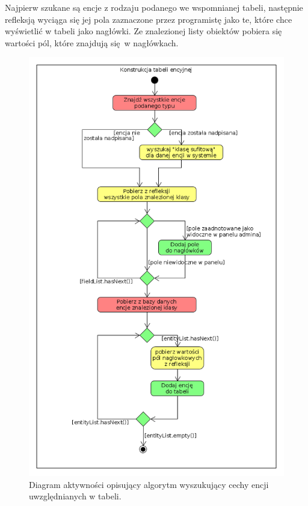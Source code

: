 Najpierw szukane są encje z rodzaju podanego we wspomnianej tabeli, następnie refleksją wyciąga się jej pola zaznaczone przez programistę jako te, które chce wyświetlić w tabeli jako nagłówki. Ze znalezionej listy obiektów pobiera się wartości pól, które znajdują się w nagłówkach.
\begin{figure}
	\begin{center}
		\includegraphics[scale=0.5]{konsTabEnc.png}
	\end{center}
	\caption{{\color{black}Diagram aktywności opisujący algorytm wyszukujący cechy encji uwzględnianych w tabeli.}} \label{konsTabEnc}
\end{figure}

